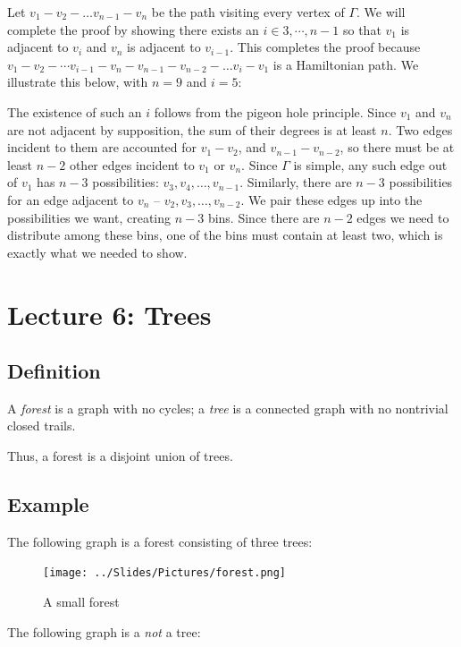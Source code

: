 \documentclass[]{article}
\begin{document}
Let \(v_1-v_2-\dots v_{n-1}-v_n\) be the path visiting every vertex of
\(\Gamma\). We will complete the proof by showing there exists an
\(i\in 3,\cdots, n-1\) so that \(v_1\) is adjacent to \(v_i\) and
\(v_n\) is adjacent to \(v_{i-1}\). This completes the proof because
\(v_1-v_2-\cdots v_{i-1}-v_n-v_{n-1}-v_{n-2}-\dots v_i-v_1\) is a
Hamiltonian path. We illustrate this below, with \(n=9\) and \(i=5\):

The existence of such an \(i\) follows from the pigeon hole principle.
Since \(v_1\) and \(v_n\) are not adjacent by supposition, the sum of
their degrees is at least \(n\). Two edges incident to them are
accounted for \(v_1-v_2\), and \(v_{n-1}-v_{n-2}\), so there must be at
least \(n-2\) other edges incident to \(v_1\) or \(v_{n}\). Since
\(\Gamma\) is simple, any such edge out of \(v_1\) has \(n-3\)
possibilities: \(v_3, v_4, \dots, v_{n-1}\). Similarly, there are
\(n-3\) possibilities for an edge adjacent to \(v_n\) --
\(v_2,v_3,\dots, v_{n-2}\). We pair these edges up into the
possibilities we want, creating \(n-3\) bins. Since there are \(n-2\)
edges we need to distribute among these bins, one of the bins must
contain at least two, which is exactly what we needed to show.

\section{Lecture 6: Trees}

\subsection{Definition}\label{definition-3}

A \emph{forest} is a graph with no cycles; a \emph{tree} is a connected
graph with no nontrivial closed trails.

Thus, a forest is a disjoint union of trees.

\subsection{Example}\label{example-1}

The following graph is a forest consisting of three trees:

\begin{figure}[htbp]
\centering
\texttt{[image: ../Slides/Pictures/forest.png]}
\caption{A small forest}
\end{figure}

The following graph is a \emph{not} a tree:
\end{document}

